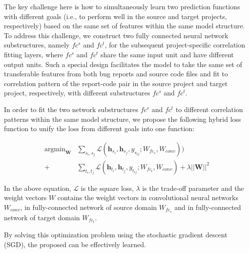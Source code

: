 
The key challenge here is how to simultaneously learn two prediction functions with different goals (i.e., to perform well in the source and target projects, respectively) based on the same set of features within the same model structure. To address this challenge, we construct two fully connected neural network substructures, namely $fc^s$ and $fc^t$, for the subsequent project-specific correlation fitting layers, where $fc^s$ and $fc^t$ share the same input unit and have different output units. Such a special design facilitates the model to take the same set of transferable features from both bug reports and source code files and fit to correlation pattern of the report-code pair in the source project and target project, respectively, with different substructures $fc^s$ and $fc^t$.


In order to fit the two network substructures $fc^s$ and $fc^t$ to different correlation patterns within the same model structure, we propose the following hybrid loss function to unify the loss from different goals into one function:

\begin{equation}
\begin{aligned}
\label{eq:lossfunction}
\mathop{\arg\min}_{\mathbf{W}}&\sum_{s_i,s_j}\mathcal{L}(\mathbf{h}_{s_i},\mathbf{h}_{s_j}
,y_{s_{ij}}; W_{fc_s}, W_{conv} ))\\
+&\sum_{t_i,t_j}\mathcal{L}(\mathbf{h}_{t_i},\mathbf{h}_{t_j},y_{t_{ij}}; W_{fc_t}, W_{conv})+\lambda||\mathbf{W}||^2
\end{aligned}
\end{equation}


In the above equation, $\mathcal{L}$ is the square loss, $\lambda$ is the trade-off parameter and the weight vectors $W$ contains the weight vectors in convolutional neural networks $W_{conv}$, in fully-connected network of source domain $W_{fc_s}$ and in fully-connected network of target domain $W_{fc_t}$.


By solving this optimization problem using the stochastic gradient descent (SGD), the proposed \TRANPCNN can be effectively learned.

